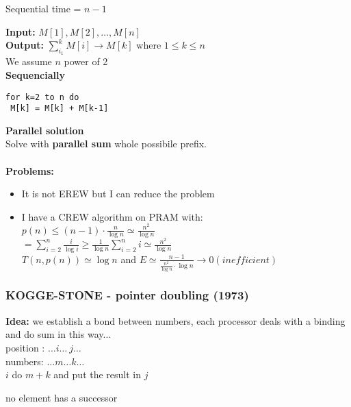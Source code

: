 Sequential time = $n - 1$

\textbf{Input:} $M[1], M[2], \dots, M[n]$\\
\textbf{Output:} $\sum_{i_1}^{k} M[i] \rightarrow M[k]$ where $1 \leq k \leq n$\\
We assume $n$ power of 2\\
\textbf{Sequencially}
\begin{lstlisting}[]
for k=2 to n do
 M[k] = M[k] + M[k-1]
\end{lstlisting}

\textbf{Parallel solution}\\
Solve with \textbf{parallel sum} whole possibile prefix.\\\\
\textbf{Problems:}
\begin{itemize}
 \item It is not EREW but I can reduce the problem
 \item I have a CREW algorithm on PRAM with:\\
 $p(n) \leq (n-1) \cdot \frac{n}{\log{n}} \simeq \frac{n^2}{\log{n}}$\\
 $= \sum_{i=2}^{n}\frac{i}{\log{i}} \geq \frac{1}{\log{n}} \sum_{i=2}^{n} i \simeq \frac{n^2}{\log{n}}$\\
 $T(n, p(n)) \simeq \log{n}$ and $E \simeq \frac{n-1}{\frac{n^2}{\log{n}} \cdot \log{n}} \rightarrow 0 (inefficient)$
\end{itemize}

\subsubsection{KOGGE-STONE - pointer doubling (1973)}
\textbf{Idea:} we establish a bond between numbers, each processor deals with a binding and do sum in this way...\\
position : $\dots i \dots \ j \dots$\\
numbers: $\dots m \dots k \dots$\\
$i$ do $m+k$ and put the result in $j$\\
\begin{remark}
 no element has a successor
\end{remark}
